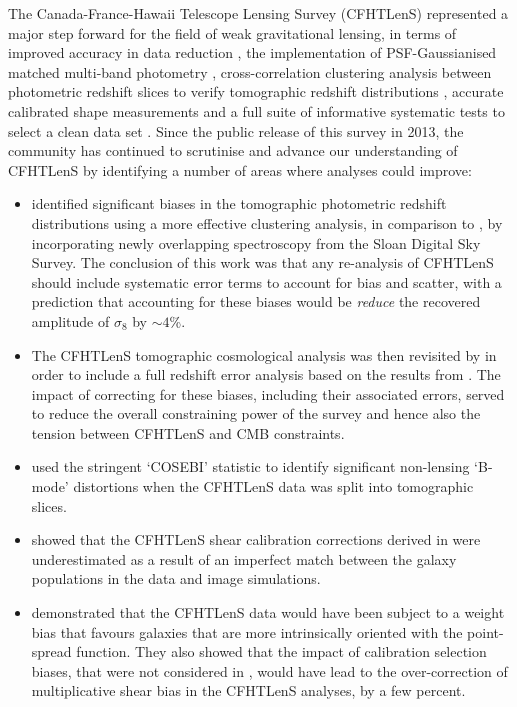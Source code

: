 The Canada-France-Hawaii Telescope Lensing Survey (CFHTLenS) represented a major step forward for the field of weak gravitational lensing, in terms of improved accuracy in data reduction \citep{erben/etal:2013}, the implementation of PSF-Gaussianised matched multi-band photometry \citep{hildebrandt/etal:2012}, cross-correlation clustering analysis between photometric redshift slices to verify tomographic redshift distributions \citep{benjamin/etal:2013}, accurate calibrated shape measurements \citep{miller/etal:2013} and a full suite of informative systematic tests to select a clean data set \citep{heymans/etal:2012}.    Since the public release of this survey in 2013, the community has continued to scrutinise and advance our understanding of CFHTLenS by identifying a number of areas where analyses could improve:
\begin{itemize}
 \item{\citet{choi/etal:2016} identified significant biases in the tomographic photometric redshift distributions using a more effective clustering analysis, in comparison to \citet{benjamin/etal:2013}, by incorporating newly overlapping spectroscopy from the Sloan Digital Sky Survey.  The conclusion of this work was that any re-analysis of CFHTLenS should include systematic error terms to account for bias and scatter, with a prediction that accounting for these biases would be {\it reduce} the recovered amplitude of $\sigma_8$ by $\sim 4$\%. }
\item{ The CFHTLenS tomographic cosmological analysis was then revisited by \citet{joudaki/etal:2016} in order to include a full redshift error analysis based on the results from \citet{choi/etal:2016}.  The impact of correcting for these biases, including their associated errors, served to reduce the overall constraining power of the survey and hence also the tension between CFHTLenS and CMB constraints.}
 \item{\citet{asgari/etal:2016} used the stringent `COSEBI' statistic to identify significant non-lensing `B-mode' distortions when the CFHTLenS data was split into tomographic slices.}
\item{\citet{kuijken/etal:2015} showed that the CFHTLenS shear calibration corrections derived in \citet{miller/etal:2013} were underestimated as a result of an imperfect match between the galaxy populations in the data and image simulations.}
\item{\citet{fenechconti/etal:2016} demonstrated that the CFHTLenS data would have been subject to a weight bias that favours galaxies that are more intrinsically oriented with the point-spread function.  They also showed that the impact of calibration selection biases, that were not considered in \citet{miller/etal:2013}, would have lead to the over-correction of multiplicative shear bias in the CFHTLenS analyses, by a few percent.}

\end{itemize}
